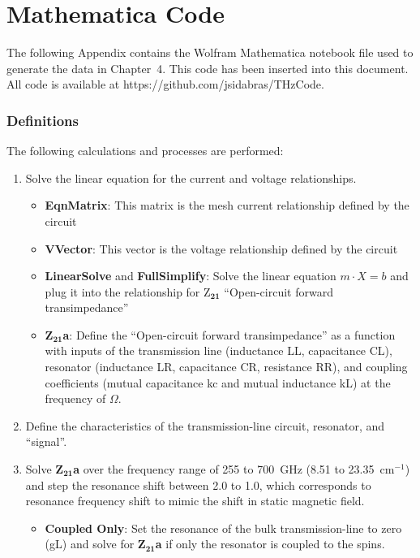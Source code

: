 \chapter[Mathematica Code]{Mathematica Code}

The following Appendix contains the Wolfram Mathematica notebook file used to generate the data in Chapter~4. This code has been inserted into this document. All code is available at https://github.com/jsidabras/THzCode.

\subsection*{Definitions}

The following calculations and processes are performed:

\begin{enumerate}
    \item Solve the linear equation for the current and voltage relationships.
    \begin{itemize}
        \item \textbf{EqnMatrix}: This matrix is the mesh current relationship defined by the circuit
        \item \textbf{VVector}: This vector is the voltage relationship defined by the circuit
        \item \textbf{LinearSolve} and \textbf{FullSimplify}: Solve the linear equation $m\cdot X=b$ and plug it into the relationship for Z$_{\mathbf{21}}$ ``Open-circuit forward transimpedance''
        \item \textbf{Z$_{\mathbf{21}}$a}: Define the ``Open-circuit forward transimpedance'' as a function with inputs of the transmission line (inductance LL, capacitance CL), resonator (inductance LR, capacitance CR, resistance RR), and coupling coefficients (mutual capacitance kc and mutual inductance kL) at the frequency of $\Omega$.
    \end{itemize}
    \item Define the characteristics of the transmission-line circuit, resonator, and ``signal''.
    \item Solve \textbf{Z$_{\mathbf{21}}$a} over the frequency range of 255 to 700~GHz (8.51 to 23.35~cm$^{-1}$) and step the resonance shift between 2.0 to 1.0, which corresponds to resonance frequency shift to mimic the shift in static magnetic field.
    \begin{itemize}
        \item \textbf{Coupled Only}: Set the resonance of the bulk transmission-line to zero (gL) and solve for \textbf{Z$_{\mathbf{21}}$a} if only the resonator is coupled to the spins.

\end{itemize}
\end{enumerate}
